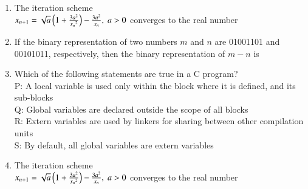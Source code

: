 \documentclass[journal,,12pt,onecolumn]{IEEEtran}
\theoremstyle{remark}
\begin{document}
\begin{enumerate}
\item The iteration scheme\\
$x_{n+1}=\sqrt{a}\left(1+\frac{3a^2}{{x_n}^2}\right)-\frac{3a^2}{x_n},\; a>0$ converges to the real number
\begin{enumerate}
\end{enumerate}
\bigskip
\item If the binary representation of two numbers $m$ and $n$ are 01001101 and 00101011, respectively, then the binary representation of $m-n$ is 
\begin{enumerate}
\end{enumerate}
\bigskip
\item Which of the following statements are true in a C program?\\
P: A local variable is used only within the block where it is defined, and its sub-blocks\\
Q: Global variables are declared outside the scope of all blocks\\
R: Extern variables are used by linkers for sharing between other compilation units\\
S: By default, all global variables are extern variables
\begin{enumerate}
\end{enumerate}
\bigskip
\item The iteration scheme\\
$x_{n+1}=\sqrt{a}\left(1+\frac{3a^2}{{x_n}^2}\right)-\frac{3a^2}{x_n},\; a>0$ converges to the real number

\end{enumerate}
\end{document}
